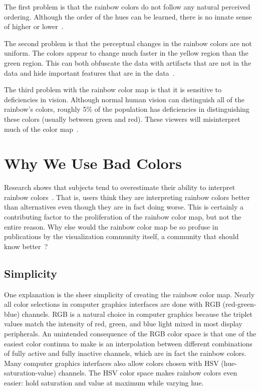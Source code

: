 \documentclass[letterpaper,twocolumn,fleqn]{article}
\newcommand*{\lcite}[1]{~\cite{#1}}
\newcommand{\fix}[1]{}
\begin{document}
The first problem is that the rainbow colors do not follow any natural
perceived ordering. Although the order of the hues can be learned, there is
no innate sense of higher or lower\lcite{Ware2004}.

The second problem is that the perceptual changes in the rainbow colors are
not uniform. The colors appear to change much faster in the yellow region
than the green region. This can both obfuscate the data with artifacts that
are not in the data and hide important features that are in the
data\lcite{Borland2007}.

The third problem with the rainbow color map is that it is sensitive to
deficiencies in vision. Although normal human vision can distinguish all of
the rainbow's colors, roughly 5\% of the population has deficiencies in
distinguishing these colors (usually between green and red). These viewers
will misinterpret much of the color map\lcite{Light2004}.


\section{Why We Use Bad Colors}

\noindent
Research shows that subjects tend to overestimate their ability to
interpret rainbow colors\lcite{Borkin2011}\fix{overestimate ref}. That is,
users think they are interpreting rainbow colors better than alternatives
even though they are in fact doing worse. This is certainly a contributing
factor to the proliferation of the rainbow color map, but not the entire
reason. Why else would the rainbow color map be so profuse in publications
by the visualization community itself, a community that should know
better\lcite{Borland2007}?

\subsection{Simplicity}

\noindent
One explanation is the sheer simplicity of creating the rainbow color map.
Nearly all color selections in computer graphics interfaces are done with
RGB (red-green-blue) channels. RGB is a natural choice in computer graphics
because the triplet values match the intensity of red, green, and blue
light mixed in most display peripherals. An unintended consequence of the
RGB color space is that one of the easiest color continua to make is an
interpolation between different combinations of fully active and fully
inactive channels, which are in fact the rainbow colors. Many computer
graphics interfaces also allow colors chosen with HSV
(hue-saturation-value) channels. The HSV color space makes rainbow colors
even easier: hold saturation and value at maximum while varying hue.
\end{document}
